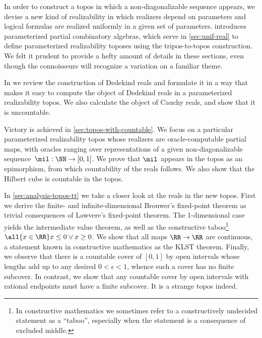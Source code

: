In order to construct a topos in which a non-diagonalizable sequence appears, we devise a new kind of realizability in which realizers depend on parameters and logical formulas are realized uniformly in a given set of parameters.  introduces parameterized partial combinatory algebras, which serve in \cref{sec:unif-real} to define parameterized realizability toposes using the tripos-to-topos construction. We felt it prudent to provide a hefty amount of details in these sections, even though the connoisseurs will recognize a variation on a familiar theme.

In  we review the construction of Dedekind reals and formulate it in a way that makes it easy to compute the object of Dedekind reals in a parameterized realizability topos. We also calculate the object of Cauchy reals, and show that it is uncountable.

Victory is achieved in \cref{sec:topos-with-countable}. We focus on a particular parameterized realizability topos whose realizers are oracle-computable partial maps, with oracles ranging over representations of a given non-diagonalizable sequence~$\mil : \NN \to [0,1]$. We prove that $\mil$ appears in the topos as an epimorphism, from which countability of the reals follows.
We also show that the Hilbert cube is countable in the topos.

In \cref{sec:analysis-topos-tt} we take a closer look at the reals in the new topos.
%
First we derive the finite- and infinite-dimensional Brouwer's fixed-point theorem as trivial consequences of Lawvere's fixed-point theorem. The 1-dimensional case yields the intermediate value theorem, as well as the constructive taboo\footnote{In constructive mathematics we sometimes refer to a constructively undecided statement as a ``taboo'', especially when the statement is a consequence of excluded middle.} $\all{x \in \RR} x \leq 0 \lor x \geq 0$.
%
We show that all maps $\RR \to \RR$ are continuous, a statement known in constructive mathematics as the KLST theorem.
%
Finally, we observe that there is a countable cover of $[0,1]$ by open intervals whose lengths add up to any desired $0 < \epsilon < 1$, whence such a cover has no finite subcover. In contrast, we show that any countable cover by open intervals with rational endpoints must have a finite subcover. It is a strange topos indeed.

